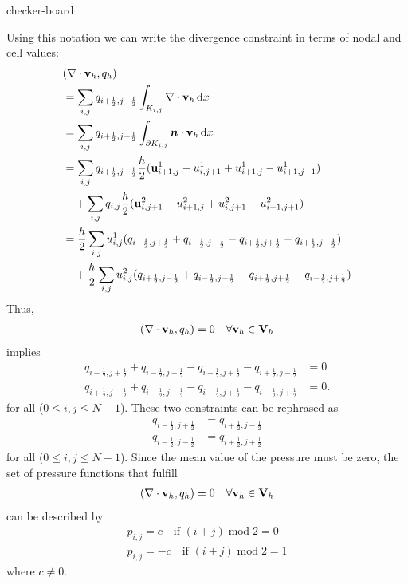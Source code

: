 \begin{Problem}{checker-board}
\begin{solution}
Using this notation we can write the divergence constraint in terms of nodal and cell values:
\begin{align}
 &(\nabla \cdot \mathbf v_h, q_h)\\
   &= \sum_{i,j} q_{i+\frac12,j+\frac12} \int_{K_{i,j}} \nabla \cdot \mathbf v_h \,\mathrm{d}x\\
   &= \sum_{i,j} q_{i+\frac12,j+\frac12} \int_{\partial K_{i,j}} \boldsymbol{n} \cdot \mathbf v_h \,\mathrm{d}x\\
   &= \sum_{i,j} q_{i+\frac12,j+\frac12} \frac{h}{2}(\mathbf u^1_{i+1,j}-u^1_{i,j+1}+u^1_{i+1,j}-u^1_{i+1,j+1})\\
      &\quad +\sum_{i,j} q_{i,j} \frac{h}{2}(\mathbf u^2_{i,j+1}-u^2_{i+1,j}+u^2_{i,j+1}-u^2_{i+1,j+1})\\
   &= \frac{h}{2}\sum_{i,j} u^1_{i,j}(q_{i-\frac12,j+\frac12}+q_{i-\frac12,j-\frac12}-q_{i+\frac12,j+\frac12}-q_{i+\frac12,j-\frac12})\\
      &\quad +\frac{h}{2}\sum_{i,j} u^2_{i,j}(q_{i+\frac12,j-\frac12}+q_{i-\frac12,j-\frac12}-q_{i+\frac12,j+\frac12}-q_{i-\frac12,j+\frac12})
\end{align}
Thus,
\begin{align}
(\nabla \cdot \mathbf v_h, q_h)=0 \quad \forall \mathbf v_h\in \mathbf V_h
\end{align}
implies
\begin{align}
q_{i-\frac12,j+\frac12}+q_{i-\frac12,j-\frac12}-q_{i+\frac12,j+\frac12}-q_{i+\frac12,j-\frac12} &=0 \\
q_{i+\frac12,j-\frac12}+q_{i-\frac12,j-\frac12}-q_{i+\frac12,j+\frac12}-q_{i-\frac12,j+\frac12} &=0.
\end{align}
for all ($0\leq i,j \leq N-1$).
These two constraints can be rephrased as
\begin{align}
q_{i-\frac12,j+\frac12} &= q_{i+\frac12,j-\frac12} \\
q_{i-\frac12,j-\frac12} &= q_{i+\frac12,j+\frac12}
\end{align}
for all ($0\leq i,j \leq N-1$). Since the mean value of the pressure must be zero,
the set of pressure functions that fulfill
\begin{align}
(\nabla \cdot \mathbf v_h, q_h)=0 \quad \forall \mathbf v_h\in \mathbf V_h
\end{align}
can be described by
\begin{align}
 p_{i,j} = c \quad \text{if } (i+j) \operatorname{mod} 2 = 0\\
 p_{i,j} = -c \quad \text{if } (i+j) \operatorname{mod} 2 = 1
\end{align}
where $c\not=0$.
\end{solution}
\end{Problem}

